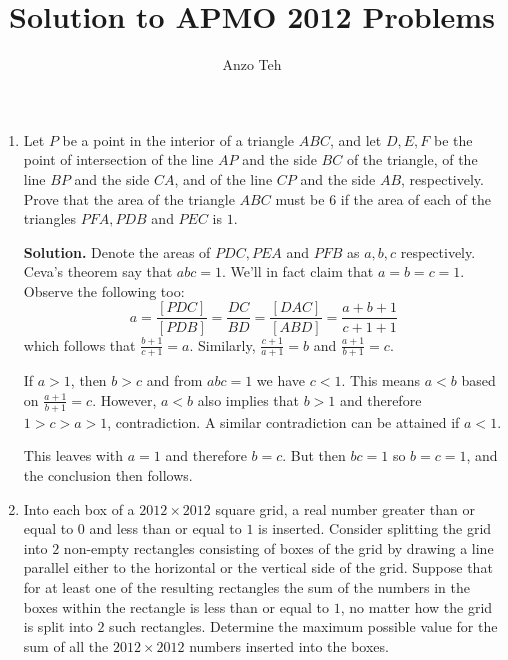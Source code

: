 \documentclass[11pt,a4paper]{article}
\begin{document}
\newcommand{\la}{\leftarrow}
\newcommand{\lra}{\leftrightarrow}
\newcommand{\bbN}{\mathbb{N}}
\newcommand{\bbZ}{\mathbb{Z}}
\newcommand{\dsum}{\displaystyle\sum}
\newcommand{\dprod}{\displaystyle\prod}


\title{Solution to APMO 2012 Problems}
\author{Anzo Teh}
\date{}
\maketitle

\begin{enumerate}
	\item Let $ P $ be a point in the interior of a triangle $ ABC $, and let $ D, E, F $ be the point of intersection of the line $ AP $ and the side $ BC $ of the triangle, of the line $ BP $ and the side $ CA $, and of the line $ CP $ and the side $ AB $, respectively. Prove that the area of the triangle $ ABC $ must be $ 6  $ if the area of each of the triangles $ PFA, PDB $ and $ PEC $ is $ 1 $.
	
	\textbf{Solution.} Denote the areas of $PDC, PEA$ and $PFB$ as $a, b, c$ respectively. Ceva's theorem say that $abc=1$. We'll in fact claim that $a=b=c=1$. Observe the following too: 
	\[
	a=\frac{[PDC]}{[PDB]}=\frac{DC}{BD}=\frac{[DAC]}{[ABD]}=\frac{a+b+1}{c+1+1}
	\]
	which follows that $\frac{b+1}{c+1}=a$. Similarly, $\frac{c+1}{a+1}=b$ and $\frac{a+1}{b+1}=c$. 
	
	If $a>1$, then $b>c$ and from $abc=1$ we have $c<1$. This means $a<b$ based on $\frac{a+1}{b+1}=c$. However, $a<b$ also implies that $b>1$ and therefore $1>c>a>1$, contradiction. A similar contradiction can be attained if $a<1$. 
	
	This leaves with $a=1$ and therefore $b=c$. But then $bc=1$ so $b=c=1$, and the conclusion then follows. 
	
	\item Into each box of a $ 2012 \times 2012 $ square grid, a real number greater than or equal to $ 0 $ and less than or equal to $ 1 $ is inserted. Consider splitting the grid into $2$ non-empty rectangles consisting of boxes of the grid by drawing a line parallel either to the horizontal or the vertical side of the grid. Suppose that for at least one of the resulting rectangles the sum of the numbers in the boxes within the rectangle is less than or equal to $ 1 $, no matter how the grid is split into $2$ such rectangles. Determine the maximum possible value for the sum of all the $ 2012 \times 2012 $ numbers inserted into the boxes.
	

\end{enumerate}
\end{document}
